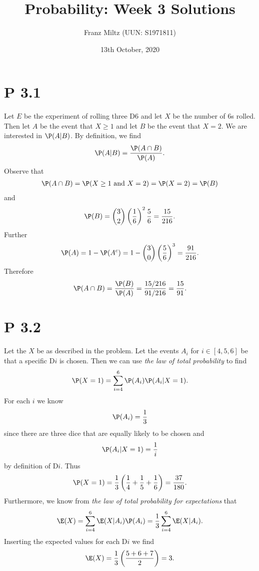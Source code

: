 \documentclass{article}
\begin{document}
\title{Probability: Week 3 Solutions}
\author{Franz Miltz (UUN: S1971811)}
\date{13th October, 2020}
\maketitle


\section*{P 3.1}


Let $E$ be the experiment of rolling three D6 and let $X$ be the number of 6s rolled.
Then let $A$ be the event that $X\geq 1$ and let $B$ be the event that $X=2$.
We are interested in $\P(A|B)$. By definition, we find
\begin{align*}
	\P(A|B) = \frac{\P(A\cap B)}{\P(A)}.
\end{align*}
Observe that
\begin{align*}
	\P(A\cap B) = \P(X\geq 1 \text{ and } X = 2) = \P(X=2) = \P(B)
\end{align*}
and
\begin{align*}
	\P(B) = \binom{3}{2}\left(\frac{1}{6}\right)^2\frac{5}{6}=\frac{15}{216}.
\end{align*}
Further
\begin{align*}
	\P(A) = 1-\P(A^c) = 1-\binom{3}{0}\left(\frac{5}{6}\right)^3=\frac{91}{216}.
\end{align*}
Therefore
\begin{align*}
	\P(A\cap B) = \frac{\P(B)}{\P(A)}= \frac{15/216}{91/216} = \frac{15}{91}.
\end{align*}


\section*{P 3.2}


Let the $X$ be as described in the problem. Let the events
$A_i$ for $i\in[4,5,6]$ be that a specific D$i$ is chosen.
Then we can use \emph{the law of total probability} to find
\begin{align*}
	\P(X=1)=\sum_{i=4}^6\P(A_i)\P(A_i|X=1).
\end{align*}
For each $i$ we know
\begin{align*}
	\P(A_i) = \frac{1}{3}
\end{align*}
since there are three dice that are equally likely to be chosen and
\begin{align*}
	\P(A_i|X=1) = \frac{1}{i}
\end{align*}
by definition of D$i$.
Thus
\begin{align*}
	\P(X=1) = \frac{1}{3}\left(\frac{1}{4}+\frac{1}{5}+\frac{1}{6}\right)=\frac{37}{180}.
\end{align*}
Furthermore, we know from \emph{the law of total probability for expectations} that
\begin{align*}
	\E(X) = \sum_{i=4}^6 \E(X|A_i)\P(A_i) = \frac{1}{3}\sum_{i=4}^6\E(X|A_i).
\end{align*}
Inserting the expected values for each D$i$ we find
\begin{align*}
	\E(X) = \frac{1}{3}\left(\frac{5 + 6 + 7}{2}\right)=3.
\end{align*}
\end{document}
